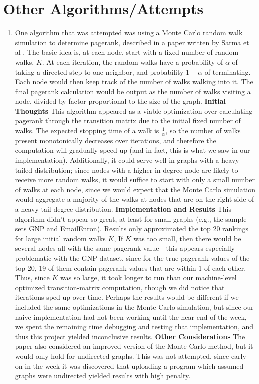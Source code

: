 \documentclass{article}
\begin{document}
\section{Other Algorithms/Attempts}
\begin{enumerate}
\item One algorithm that was attempted was using a Monte Carlo random walk simulation
to determine pagerank, described in a paper written by Sarma et al \cite{sarma2013fast}. 
The basic idea is, at each node,
start with a fixed number of random walks, $K$. At each iteration, the random 
walks have a probability of $\alpha$ of taking a directed step to one neighbor,
and probability $1-\alpha$ of terminating. Each node would then keep track of
the number of walks walking into it. The final pagerank calculation would be output
as the number of walks visiting a node, divided by factor proportional
to the size of the graph. 
    \subitem \textbf{Initial Thoughts} This algorithm appeared as a viable optimization
    over calculating pagerank through the transition matrix due to the initial fixed 
    number of walks. The expected stopping time of a walk is $\frac{1}{\alpha}$, so
    the number of walks present monotonically decreases over iterations, and therefore
    the computation will gradually speed up (and in fact, this is what we saw 
    in our implementation). Additionally, it could serve well in graphs with a 
    heavy-tailed distribution; since nodes with a higher in-degree node 
    are likely to receive more random walks, it would suffice to start with only
    a small number of walks at each node, since we would expect that the Monte Carlo
    simulation would aggregate a majority of the walks at nodes that are on the 
    right side of a heavy-tail degree distribution. 
    \subitem \textbf{Implementation and Results} This algorithm didn't appear so great,
    at least for small graphs (e.g., the sample sets GNP and EmailEnron). Results
    only approximated the top 20 rankings for large initial random walks $K$,  
    If $K$ was too small, then there would be several nodes all with the same
    pagerank value - this appears especially problematic with the GNP dataset, 
    since for the true pagerank values of the top 20, 19 of them contain
    pagerank values that are within 1 of each other. Thus, since $K$ was so large,
    it took longer to run than our machine-level optimized transition-matrix computation,
    though we did notice that iterations sped up over time. Perhaps the results would be different if we included
    the same optimizations in the Monte Carlo simulation, but since our naive implementation
    had not been working until the near end of the week, we spent the remaining time
    debugging and testing that implementation, and thus
    this project yielded inconclusive results. 
    \subitem \textbf{Other Considerations} The paper also considered an improved version
    of the Monte Carlo method, but it would only hold for undirected graphs. This was not attempted,
    since early on in the week it was discovered that uploading a program which assumed graphs
    were undirected yielded results with high penalty.
    

\end{enumerate}
\end{document}
